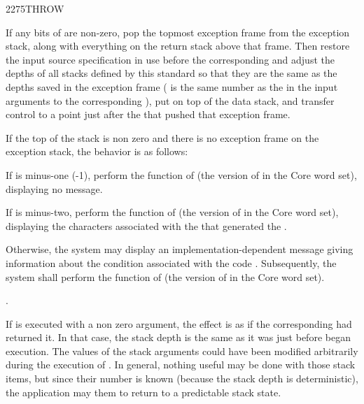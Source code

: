 \begin{worddef}{2275}{THROW}
\item {}

	If any bits of  are non-zero, pop the topmost exception
	frame from the exception stack, along with everything on the
	return stack above that frame. Then restore the input source
	specification in use before the corresponding 
	and adjust the depths of all stacks defined by this standard
	so that they are the same as the depths saved in the exception
	frame ( is the same number as the  in the input
	arguments to the corresponding ), put  on
	top of the data stack, and transfer control to a point just after
	the  that pushed that exception frame.

	If the top of the stack is non zero and there is no exception
	frame on the exception stack, the behavior is as follows:

	If  is minus-one (-1), perform the function of
	 (the version of  in
	the Core word set), displaying no message.

	If  is minus-two, perform the function of
	 (the version of 
	in the Core word set), displaying the characters 
	associated with the  that generated the
	.

	Otherwise, the system may display an implementation-dependent
	message giving information about the condition associated with
	the  code . Subsequently, the system shall
	perform the function of  (the version
	of  in the Core word set).

\see {}.

	\begin{rationale} %
		If  is executed with a non zero argument, the effect
		is as if the corresponding  had returned it. In that
		case, the stack depth is the same as it was just before 
		began execution. The values of the  stack arguments could
		have been modified arbitrarily during the execution of .
		In general, nothing useful may be done with those stack items, but
		since their number is known (because the stack depth is deterministic),
		the application may  them to return to a predictable
		stack state.


\end{rationale}
\end{worddef}
